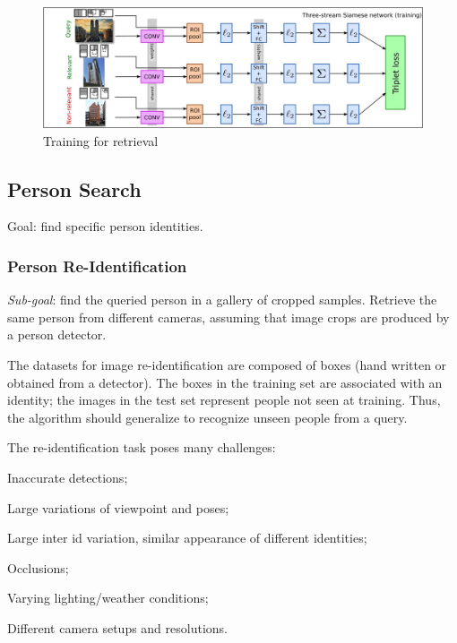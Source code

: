 \begin{figure}[h!]
    \centering
    \includegraphics[width=0.7\linewidth]{images/training-retrieval}
    \caption[Training for retrieval]{Training for retrieval}
    \label{fig:training-retrieval}
\end{figure}


\subsection{Person Search}\label{sec:vs-person}

Goal: find specific person identities.


\subsubsection{Person Re-Identification}\label{sec:vs-reidentification}

\textit{Sub-goal}: find the queried person in a gallery of cropped samples. Retrieve the same person from different cameras, assuming that image crops are produced by a person detector.

The datasets for image re-identification are composed of boxes (hand written or obtained from a detector). The boxes in the training set are associated with an identity; the images in the test set represent people not seen at training. Thus, the algorithm should generalize to recognize unseen people from a query.

The re-identification task poses many challenges:
\begin{myitem}
    \item Inaccurate detections;
    \item Large variations of viewpoint and poses;
    \item Large inter id variation, similar appearance of different identities;
    \item Occlusions;
    \item Varying lighting/weather conditions;
    \item Different camera setups and resolutions.
\end{myitem}

